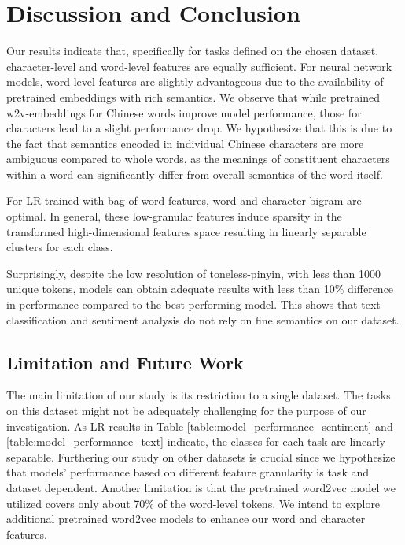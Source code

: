 \section{Discussion and Conclusion}

Our results indicate that, specifically for tasks defined on the chosen dataset, character-level and word-level features are equally sufficient. For neural network models, word-level features are slightly advantageous due to the availability of pretrained embeddings with rich semantics. We observe that while pretrained w2v-embeddings for Chinese words improve model performance, those for characters lead to a slight performance drop. We hypothesize that this is due to the fact that semantics encoded in individual Chinese characters are more ambiguous compared to whole words, as the meanings of constituent characters within a word can significantly differ from overall semantics of the word itself.

For LR trained with bag-of-word features, word and character-bigram are optimal. In general, these low-granular features induce sparsity in the transformed high-dimensional features space resulting in linearly separable clusters for each class.  

Surprisingly, despite the low resolution of toneless-pinyin, with less than 1000 unique tokens, models can obtain adequate results with less than 10\% difference in performance compared to the best performing model. This shows that text classification and sentiment analysis do not rely on fine semantics on our dataset.  

\subsection{Limitation and Future Work}
The main limitation of our study is its restriction to a single dataset. The tasks on this dataset might not be adequately challenging for the purpose of our investigation. As LR results in Table \ref{table:model_performance_sentiment} and \ref{table:model_performance_text} indicate, the classes for each task are linearly separable. Furthering our study on other datasets is crucial since we hypothesize that models' performance based on different feature granularity is task and dataset dependent. Another limitation is that the pretrained word2vec model we utilized covers only about 70\% of the word-level tokens. We intend to explore additional pretrained word2vec models to enhance our word and character features. 


